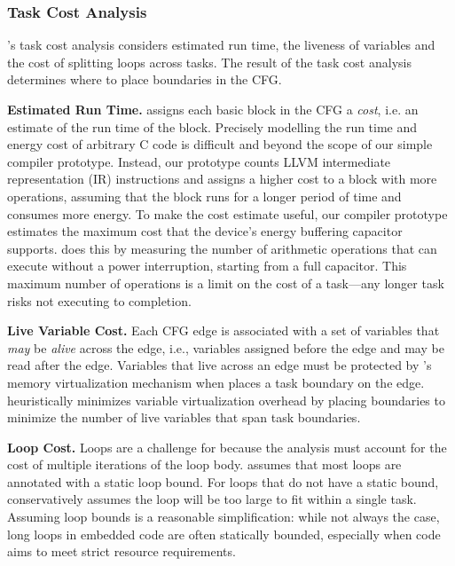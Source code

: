 %
%

\subsubsection{Task Cost Analysis}

\sys's task cost analysis considers estimated run time, the liveness of
variables and the cost of splitting loops across tasks. The result of the task
cost analysis determines where to place boundaries in the CFG.
 
\textbf{Estimated Run Time.} \sys assigns each basic block in the CFG a
{\em cost}, i.e. an estimate of the run time of the block. Precisely
modelling the run time and energy cost of arbitrary C code is difficult and
beyond the scope of our simple compiler prototype. Instead, our prototype counts
LLVM intermediate representation (IR) instructions and assigns a higher cost to
a block with more operations, assuming that the block runs for a longer period
of time and consumes more energy. To make the cost estimate useful, our compiler prototype estimates the maximum cost that the device's energy buffering capacitor supports. \sys does this by measuring the number of arithmetic operations that can execute without a power interruption, starting from a full capacitor. This maximum number of operations is a limit on the cost of a task---any longer task risks not executing to completion.

\textbf{Live Variable Cost.} Each CFG edge is associated with a set of
variables that {\em may} be {\em alive} across the edge, i.e., variables
assigned before the edge and may be read after the edge. Variables that live
across an edge must be protected by \sys's memory virtualization mechanism when
\sys places a task boundary on the edge. \sys heuristically minimizes variable
virtualization overhead by placing boundaries to minimize the number of
live variables that span task boundaries.

\textbf{Loop Cost.} Loops are a challenge for \sys because the analysis
must account for the cost of multiple iterations of the loop body. \sys assumes
that most loops are annotated with a static loop bound. For loops that do not
have a static bound, \sys conservatively assumes the loop will be too large to
fit within a single task. Assuming loop bounds is a reasonable simplification:
while not always the case, long loops in embedded code are often statically
bounded, especially when code aims to meet strict resource requirements. 

